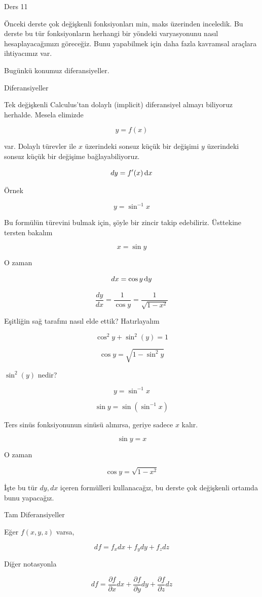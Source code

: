 \documentclass[12pt,fleqn]{article}\usepackage{../../common}
\begin{document}
Ders 11

Önceki derste çok değişkenli fonksiyonları min, maks üzerinden
inceledik. Bu derste bu tür fonksiyonların herhangi bir yöndeki
varyasyonunu nasıl hesaplayacağımızı göreceğiz. Bunu yapabilmek için daha
fazla kavramsal araçlara ihtiyacımız var. 

Bugünkü konumuz diferansiyeller. 

Diferansiyeller

Tek değişkenli Calculus'tan dolaylı (implicit) diferansiyel almayı
biliyoruz herhalde. Mesela elimizde

$$ y = f(x) $$

var. Dolaylı türevler ile $x$ üzerindeki sonsuz küçük bir değişimi $y$
üzerindeki sonsuz küçük bir değişime bağlayabiliyoruz. 

$$ dy = f'(x) \,\mathrm{d} x $$

Örnek

$$ y = \sin^{-1} x $$

Bu formülün türevini bulmak için, şöyle bir zincir takip
edebiliriz. Üsttekine tersten bakalım

$$ x = \sin y $$

O zaman

$$ dx = \cos y \,\mathrm{d} y $$

$$ 
\frac{dy}{dx} = \frac{1}{\cos y} = \frac{1}{\sqrt{1-x^2}}
 $$

Eşitliğin sağ tarafını nasıl elde ettik? Hatırlayalım

$$ \cos^2 y + \sin^2(y) = 1 $$

$$ \cos y = \sqrt{1 - \sin^2y} $$

$\sin^2(y)$ nedir? 

$$ y = \sin^{-1} x $$

$$ \sin y = \sin(\sin^{-1}x) $$

Ters sinüs fonksiyonunun sinüsü alınırsa, geriye sadece $x$ kalır. 

$$ \sin y = x $$

O zaman

$$ \cos y = \sqrt{1 - x^2} $$

İşte bu tür $dy,dx$ içeren formülleri kullanacağız, bu derste çok
değişkenli ortamda bunu yapacağız. 

Tam Diferansiyeller

Eğer $f(x,y,z)$ varsa, 

$$ df = f_xdx + f_ydy + f_zdz $$

Diğer notasyonla

$$ df = \frac{\partial f}{\partial x}dx + \frac{\partial f}{\partial y}dy + 
\frac{\partial f}{\partial z}dz $$
\end{document}

